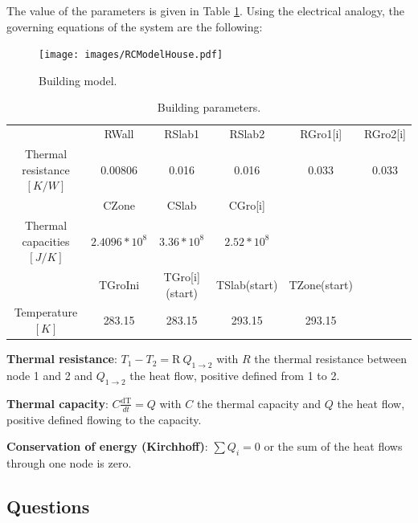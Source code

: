 \documentclass[10pt,a4paper]{article}
\begin{document}
The value of the parameters is given in Table \ref{tab:par}. Using the electrical analogy, the governing equations of the system are the following:

\begin{figure}[hbtp] 
	\centering
	\texttt{[image: images/RCModelHouse.pdf]}
	\caption{ Building model.}
	\label{fig:bui}
\end{figure}

\begin{table}[hbtp] 
\begin{tabular}{cccccc}
\hline 
  & RWall & RSlab1 & RSlab2 & RGro1[i] & RGro2[i] \\  
Thermal resistance $[K/W]$ & 0.00806 & 0.016 & 0.016 & 0.033 & 0.033 \\ 
\hline\hline 
  & CZone & CSlab & CGro[i] &   &   \\  
Thermal capacities $[J/K]$ & $2.4096 * 10^8$ & $3.36 * 10^8$ & $2.52*10^8$ &   &   \\ 
\hline\hline
  & TGroIni & TGro[i](start) & TSlab(start) & TZone(start)&  \\  
Temperature $[K]$ &  283.15 & 283.15 & 293.15 & 293.15 & \\ 
\hline 
\end{tabular} 
\caption{ Building parameters.}
\label{tab:par}
\end{table}

\textbf{Thermal resistance}: $T_1 - T_2 = \text{R} \ Q_{1 \rightarrow 2} $ with $R$ the thermal resistance between node 1 and 2 and $Q_{1\rightarrow 2}$ the heat flow, positive defined from 1 to 2.

\textbf{Thermal capacity}: $C \frac{\text{dT}}{dt} = Q$ with $C$ the thermal capacity and $Q$ the heat flow, positive defined flowing to the capacity.

\textbf{Conservation of energy (Kirchhoff)}: $ \sum Q_i = 0$ or the sum of the heat flows through one node is zero.

\subsection*{Questions}
\end{document}
